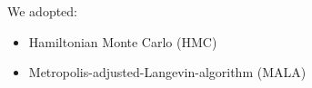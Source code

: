 \documentclass[landscape,a0b,final,a4resizeable]{include/a0poster}
\begin{document}
\begin{poster}
\begin{multicols}{3}
We adopted:
\begin{itemize}
\item Hamiltonian Monte Carlo (HMC) 
\item Metropolis-adjusted-Langevin-algorithm (MALA) 
\end{itemize}
 

\newpage 


\end{multicols}
\end{poster}
\end{document}
